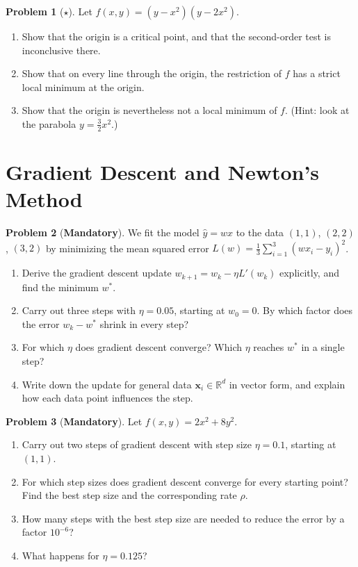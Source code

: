 \documentclass[11pt]{article}
\theoremstyle{definition}
\newtheorem{problem}{Problem}[section]
\newcommand{\mandatory}{\textcolor{red!70!black}{\textbf{Mandatory}}}
\begin{document}
\begin{problem}[$\star$]\label{pr:peano}
    Let $f(x, y) = (y - x^2)(y - 2x^2)$.
    \begin{enumerate}[label=(\alph*)]
        \item Show that the origin is a critical point, and that the second-order test is inconclusive there.
        \item Show that on every line through the origin, the restriction of $f$ has a strict local minimum at the origin.
        \item Show that the origin is nevertheless not a local minimum of $f$. (Hint: look at the parabola $y = \frac{3}{2}x^2$.)
    \end{enumerate}
\end{problem}

\section{Gradient Descent and Newton's Method}

\begin{problem}[\mandatory]\label{pr:gd-mse}
    We fit the model $\hat y = wx$ to the data $(1, 1)$, $(2, 2)$, $(3, 2)$ by minimizing the mean squared error $L(w) = \frac{1}{3}\sum_{i=1}^3 (wx_i - y_i)^2$.
    \begin{enumerate}[label=(\alph*)]
        \item Derive the gradient descent update $w_{k+1} = w_k - \eta L'(w_k)$ explicitly, and find the minimum $w^*$.
        \item Carry out three steps with $\eta = 0.05$, starting at $w_0 = 0$. By which factor does the error $w_k - w^*$ shrink in every step?
        \item For which $\eta$ does gradient descent converge? Which $\eta$ reaches $w^*$ in a single step?
        \item Write down the update for general data $\mathbf{x}_i \in \mathbb{R}^d$ in vector form, and explain how each data point influences the step.
    \end{enumerate}
\end{problem}

\begin{problem}[\mandatory]\label{pr:gd-quadratic}
    Let $f(x, y) = 2x^2 + 8y^2$.
    \begin{enumerate}[label=(\alph*)]
        \item Carry out two steps of gradient descent with step size $\eta = 0.1$, starting at $(1, 1)$.
        \item For which step sizes does gradient descent converge for every starting point? Find the best step size and the corresponding rate $\rho$.
        \item How many steps with the best step size are needed to reduce the error by a factor $10^{-6}$?
        \item What happens for $\eta = 0.125$?
    \end{enumerate}
\end{problem}
\end{document}

